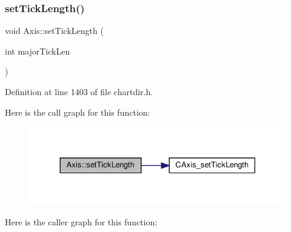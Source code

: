 \subsubsection{\texorpdfstring{set\+Tick\+Length()}{setTickLength()}\hspace{0.1cm}{\footnotesize\ttfamily [1/2]}}
{\footnotesize\ttfamily void Axis\+::set\+Tick\+Length (\begin{DoxyParamCaption}\item[{int}]{major\+Tick\+Len }\end{DoxyParamCaption})\hspace{0.3cm}{\ttfamily [inline]}}



Definition at line 1403 of file chartdir.\+h.

Here is the call graph for this function\+:
\nopagebreak
\begin{figure}[H]
\begin{center}
\leavevmode
\includegraphics[width=330pt]{class_axis_aa74e4bc19a6a83b0f8dc6d3f815dd64e_cgraph}
\end{center}
\end{figure}
Here is the caller graph for this function\+:
\nopagebreak
